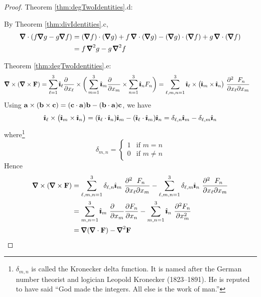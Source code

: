 \begin{proof}
\bigskip
\noindent Theorem \ref{thm:degTwoIdentities}.d:

By Theorem \ref{thm:divIdentities}.c,
\begin{align*}
\vnabla\cdot(f\vnabla g-g\vnabla f)
&= (\vnabla f)\cdot(\vnabla g) +f\,\vnabla\cdot(\vnabla g)
   -(\vnabla g)\cdot(\vnabla f) +g\,\vnabla\cdot(\vnabla f) \\
&=f\,\vnabla^2g-g\,\vnabla^2f
\end{align*}


\bigskip
\noindent Theorem \ref{thm:degTwoIdentities}.e:
\begin{align*}
\vnabla\times(\vnabla\times\vF)
&=\sum_{\ell=1}^3\hi_\ell\frac{\partial\hfill} {\partial x_\ell}
       \times\bigg(\sum_{m=1}^3 \hi_m\frac{\partial\hfill} {\partial x_m}
       \times\sum_{n=1}^3\hi_n F_n\bigg)
=\sum_{\ell,m,n=1}^3\hi_\ell\times \big(\hi_m\times\hi_n\big)\ 
          \frac{\partial^2\hfill F_n\hfill}
                           {\partial x_\ell\partial x_m}
\end{align*}
Using $\mathbf{a}\times(\mathbf{b}\times\mathbf{c})=(\mathbf{c}\cdot\mathbf{a})\mathbf{b}-(\mathbf{b}\cdot\mathbf{a})\mathbf{c}$,
we have 
\begin{equation*}
\hat{\pmb{\imath}}_\ell\times \big(\hat{\pmb{\imath}}_m\times\hat{\pmb{\imath}}_n\big)
          =(\hat{\pmb{\imath}}_\ell\cdot\hat{\pmb{\imath}}_n)\hat{\pmb{\imath}}_m -(\hat{\pmb{\imath}}_\ell\cdot\hat{\pmb{\imath}}_m)\hat{\pmb{\imath}}_n
          =\delta_{\ell,n}\hat{\pmb{\imath}}_m -\delta_{\ell,m}\hat{\pmb{\imath}}_n
\end{equation*}
where\footnote{$\delta_{m,n}$ is called the Kronecker delta function.
It is named after the German number theorist and logician Leopold Kronecker
(1823--1891). He is reputed to have said ``God made the integers. All else is the work of man.''} 
\begin{equation*}
\delta_{m,n} =\begin{cases}
                  1& \text{if $m=n$}\\
                  0& \text{if $m\ne n$}
              \end{cases}
\end{equation*}
Hence
\begin{align*}
\vnabla\times(\vnabla\times\vF)
&=\sum_{\ell,m,n=1}^3\delta_{\ell,n}\hi_m\ 
          \frac{\partial^2\hfill F_n\hfill}
                           {\partial x_\ell\partial x_m}
-\sum_{\ell,m,n=1}^3\delta_{\ell,m}\hi_n\ 
          \frac{\partial^2\hfill F_n\hfill}
                           {\partial x_\ell\partial x_m} \\
&=\sum_{m,n=1}^3\hi_m\ \frac{\partial\hfill}{\partial x_m}
          \frac{\partial\hfill F_n\hfill}{\partial x_n}
-\sum_{m,n=1}^3\hi_n\  \frac{\partial^2 F_n}{\partial x_m^2}\cr
&= \vnabla(\vnabla\cdot\vF)-\vnabla^2\vF
\end{align*}
\end{proof}

